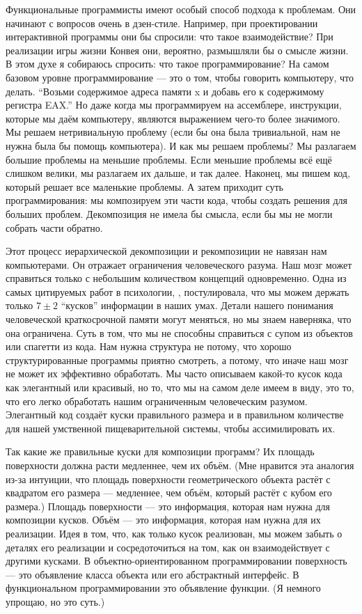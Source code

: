 Функциональные программисты имеют особый способ подхода к проблемам. Они
начинают с вопросов очень в дзен-стиле. Например, при проектировании
интерактивной программы они бы спросили: что такое взаимодействие? При
реализации игры жизни Конвея они, вероятно, размышляли бы о
смысле жизни. В этом духе я собираюсь спросить: что такое программирование?
На самом базовом уровне программирование --- это о том, чтобы говорить компьютеру, что
делать. ``Возьми содержимое адреса памяти x и добавь его к
содержимому регистра EAX.'' Но даже когда мы программируем на ассемблере,
инструкции, которые мы даём компьютеру, являются выражением чего-то
более значимого. Мы решаем нетривиальную проблему (если бы она была
тривиальной, нам не нужна была бы помощь компьютера). И как мы решаем
проблемы? Мы разлагаем большие проблемы на меньшие проблемы. Если
меньшие проблемы всё ещё слишком велики, мы разлагаем их дальше, и так
далее. Наконец, мы пишем код, который решает все маленькие проблемы. А затем
приходит суть программирования: мы композируем эти части кода, чтобы
создать решения для больших проблем. Декомпозиция не имела бы смысла,
если бы мы не могли собрать части обратно.

Этот процесс иерархической декомпозиции и рекомпозиции не
навязан нам компьютерами. Он отражает ограничения человеческого
разума. Наш мозг может справиться только с небольшим количеством концепций одновременно.
Одна из самых цитируемых работ в психологии,
, постулировала, что мы можем держать только
$7 \pm 2$ ``кусков'' информации в наших умах. Детали нашего
понимания человеческой краткосрочной памяти могут меняться, но мы
знаем наверняка, что она ограничена. Суть в том, что мы не способны
справиться с супом из объектов или спагетти из кода. Нам нужна
структура не потому, что хорошо структурированные программы приятно смотреть,
а потому, что иначе наш мозг не может их эффективно обработать. Мы
часто описываем какой-то кусок кода как элегантный или красивый, но то, что мы
на самом деле имеем в виду, это то, что его легко обработать нашим ограниченным человеческим разумом.
Элегантный код создаёт куски правильного размера и в
правильном количестве для нашей умственной пищеварительной системы, чтобы ассимилировать
их.

Так какие же правильные куски для композиции программ? Их
площадь поверхности должна расти медленнее, чем их объём. (Мне нравится эта
аналогия из-за интуиции, что площадь поверхности геометрического
объекта растёт с квадратом его размера --- медленнее, чем объём,
который растёт с кубом его размера.) Площадь поверхности --- это
информация, которая нам нужна для композиции кусков. Объём --- это
информация, которая нам нужна для их реализации. Идея в том, что, как только
кусок реализован, мы можем забыть о деталях его
реализации и сосредоточиться на том, как он взаимодействует с другими кусками. В
объектно-ориентированном программировании поверхность --- это объявление класса
объекта или его абстрактный интерфейс. В функциональном программировании это
объявление функции. (Я немного упрощаю, но это
суть.)

